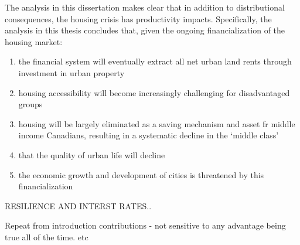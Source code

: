 The analysis in this dissertation makes clear that in addition to distributional consequences, the housing crisis has productivity impacts. Specifically, the analysis in this thesis concludes that, given the ongoing financialization of the housing market:

\begin{enumerate}
\item the financial system will eventually extract all net urban land rents through investment in urban property
\item housing accessibility will become increasingly challenging for disadvantaged groups
\item housing will be largely eliminated as a saving mechanism and asset fr middle income Canadians,  resulting in a systematic decline in the `middle class'
\item that the quality of urban life will decline
\item the economic growth and development of cities is threatened by this financialization
\end{enumerate}

RESILIENCE AND INTERST RATES..


Repeat from introduction contributions
- not sensitive to any advantage being true all of the time. etc
